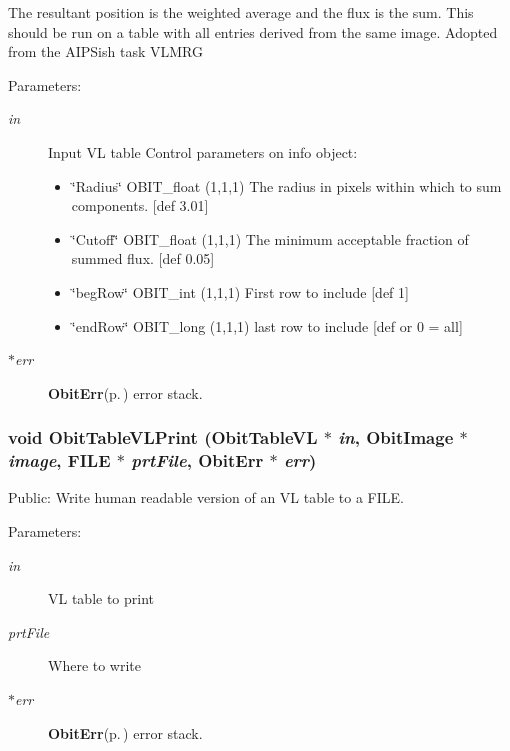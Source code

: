 The resultant position is the weighted average and the flux is the sum. This should be run on a table with all entries derived from the same image. Adopted from the AIPSish task VLMRG \begin{Desc}
\item[Parameters:]
\begin{description}
\item[{\em in}]Input VL table Control parameters on info object: \begin{itemize}
\item \char`\"{}Radius\char`\"{} OBIT\_\-float (1,1,1) The radius in pixels within which to sum components. [def 3.01] \item \char`\"{}Cutoff\char`\"{} OBIT\_\-float (1,1,1) The minimum acceptable fraction of summed flux. [def 0.05] \item \char`\"{}beg\-Row\char`\"{} OBIT\_\-int (1,1,1) First row to include [def 1] \item \char`\"{}end\-Row\char`\"{} OBIT\_\-long (1,1,1) last row to include [def or 0 = all] \end{itemize}
\item[{\em $\ast$err}]{\bf Obit\-Err}{\rm (p.\,\pageref{structObitErr})} error stack. \end{description}
\end{Desc}
\subsubsection{\setlength{\rightskip}{0pt plus 5cm}void Obit\-Table\-VLPrint ({\bf Obit\-Table\-VL} $\ast$ {\em in}, {\bf Obit\-Image} $\ast$ {\em image}, FILE $\ast$ {\em prt\-File}, {\bf Obit\-Err} $\ast$ {\em err})}\label{ObitTableVLUtil_8h_a7}


Public: Write human readable version of an VL table to a FILE. 

\begin{Desc}
\item[Parameters:]
\begin{description}
\item[{\em in}]VL table to print \item[{\em prt\-File}]Where to write \item[{\em $\ast$err}]{\bf Obit\-Err}{\rm (p.\,\pageref{structObitErr})} error stack. \end{description}
\end{Desc}
